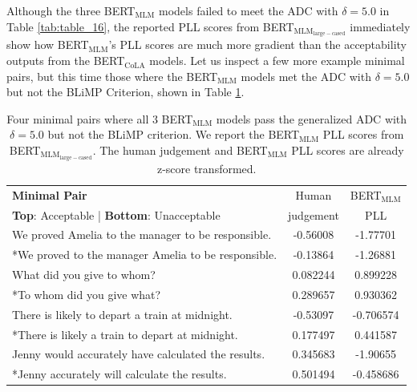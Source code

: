 Although the three BERT$_{\mathrm{MLM}}$ models failed to meet the ADC with $\delta=5.0$ in Table \ref{tab:table_16}, the reported PLL scores from BERT$_{\mathrm{MLM}_{\mathrm{large-cased}}}$ immediately show how BERT$_{\mathrm{MLM}}$'s PLL scores are much more gradient than the acceptability outputs from the BERT$_{\mathrm{CoLA}}$ models.  Let us inspect a few more example minimal pairs, but this time those where the BERT$_{\mathrm{MLM}}$ models met the ADC with $\delta=5.0$ but not the BLiMP Criterion, shown in Table \ref{tab:table_17}.

\begin{table}[h]
    \centering
    \begin{tabular}{@{}lcc@{}}
    \toprule
    \textbf{Minimal Pair} & Human & BERT$_{\mathrm{MLM}}$\\
    \textbf{Top}: Acceptable | \textbf{Bottom}: Unacceptable & judgement & PLL\\
    \toprule
    We proved Amelia to the manager to be responsible.  & -0.56008 & -1.77701 \\
    *We proved to the manager Amelia to be responsible. & -0.13864 & -1.26881 \\
    \midrule
    What did you give to whom? & 0.082244 & 0.899228 \\
    *To whom did you give what? & 0.289657 & 0.930362 \\
    \midrule
    There is likely to depart a train at midnight. & -0.53097 & -0.706574 \\
    *There is likely a train to depart at midnight.  &  0.177497 & 0.441587 \\
    \midrule
    Jenny would accurately have calculated the results. & 0.345683 & -1.90655 \\
    *Jenny accurately will calculate the results.  & 0.501494 & -0.458686 \\
    \bottomrule
    \end{tabular}
    \caption[Four minimal pairs where BERT$_{\mathrm{MLM}}$ meets the ADC\newline with $\delta=5.0$ but not the BLiMP Criterion]{Four minimal pairs where all 3 BERT$_{\mathrm{MLM}}$ models pass the generalized ADC with $\delta=5.0$ but not the BLiMP criterion. We report the BERT$_{\mathrm{MLM}}$ PLL scores from BERT$_{\mathrm{MLM}_{\mathrm{large-cased}}}$. The human judgement and BERT$_{\mathrm{MLM}}$ PLL scores are already z-score transformed.}
    \label{tab:table_17}
\end{table}

